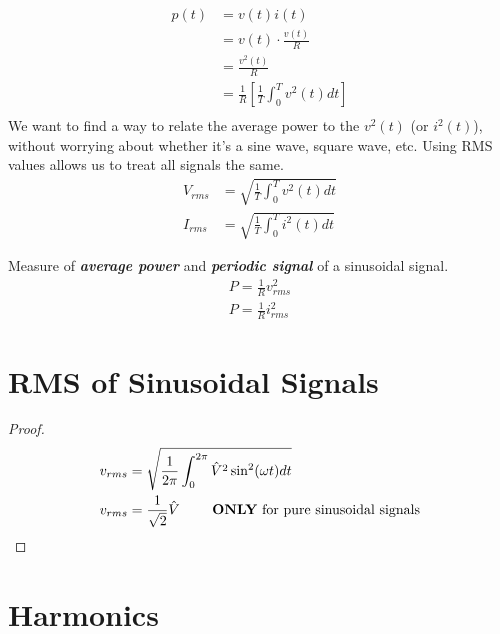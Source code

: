 \begin{theorem}
    \begin{align}
        p(t) & = v(t)i(t)                                       \\
             & = v(t) \cdot \frac{v(t)}{R}                      \\
             & = \frac{v^{2}(t)}{R}                             \\
             & = \frac{1}{R}[\frac{1}{T}\int_{0}^{T}v^{2}(t)dt] \\
    \end{align}
    We want to find a way to relate the average power to the $v^2(t)$ (or $i^2(t)$), without worrying about whether it's a sine wave, square wave, etc. Using RMS values allows us to treat all signals the same.
    \begin{align}
        V_{rms} & = \sqrt{\frac{1}{T}\int_{0}^{T}v^{2}(t)dt} \\
        I_{rms} & = \sqrt{\frac{1}{T}\int_{0}^{T}i^{2}(t)dt}
    \end{align}
\end{theorem}

\begin{definition}
    Measure of \textit{\textbf{average power}} and \textit{\textbf{periodic signal}} of a sinusoidal signal.
    \begin{align}
        P = \frac{1}{R}v_{rms}^{2} \\
        P = \frac{1}{R}i_{rms}^{2}
    \end{align}
\end{definition}

\section{RMS of Sinusoidal Signals}

\begin{proof}
    \begin{align}
        v_{rms} & = \sqrt{\frac{1}{2\pi}\int_{0}^{2\pi}\hat{V}^{2}\sin^{2}(\omega t)dt}                \\
        v_{rms} & = \frac{1}{\sqrt{2}}\hat{V} \qquad \text{ \textbf{ONLY} for pure sinusoidal signals}
    \end{align}
\end{proof}
\section{Harmonics}

